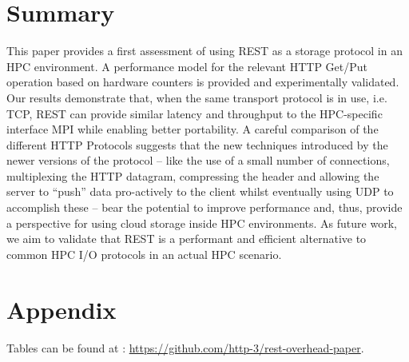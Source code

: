 \documentclass[runningheads]{llncs}
\begin{document}
\section{Summary}
This paper provides a first assessment of using REST as a storage protocol in an HPC environment. A performance model for the relevant HTTP Get/Put operation based on hardware counters is provided and experimentally validated. Our results demonstrate that, when the same transport protocol is in use, i.e. TCP, REST can provide similar latency and throughput to the HPC-specific interface MPI while enabling better portability.
A careful comparison of the different HTTP Protocols suggests that the new techniques introduced by the newer versions of the protocol -- like the use of a small number of connections, multiplexing the HTTP datagram, compressing the header and allowing the server to “push” data pro-actively to the client whilst eventually using UDP to accomplish these -- bear the potential to improve performance and, thus, provide a perspective for using cloud storage inside HPC environments.
As future work, we aim to validate that REST is a performant and efficient alternative to common HPC I/O protocols in an actual HPC scenario.
\section{Appendix}
Tables can be found at : \href{https://github.com/http-3/rest-overhead-paper}{https://github.com/http-3/rest-overhead-paper}.

\nocite{*}
%
%
%





\end{document}
